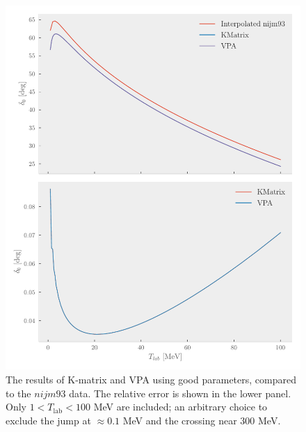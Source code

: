 \begin{figure}[ht]
  \centering
  \includegraphics[]{Figures/vpa_kmatrix_compare.pdf}
  \caption{\label{fig:vpa_matrix_compare} The results of K-matrix and VPA using
    good parameters, compared to the \(nijm93\) data. The relative error is
    shown in the lower panel. Only \mbox{\(1 < T_{\mathrm{lab}} < 100\)} MeV are
    included; an arbitrary choice to exclude the jump at \(\approx 0.1 \) MeV
    and the crossing near \(300\) MeV.}
\end{figure}

